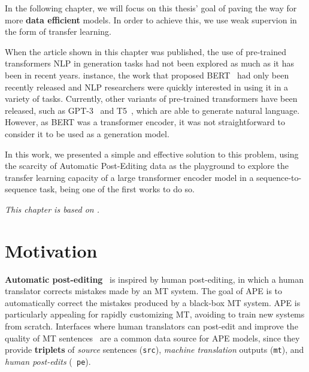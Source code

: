 \label{chap:ape}

\cleardoublepage
{}

In the following chapter, we will focus on this thesis' goal of
paving the way for more \textbf{data efficient} models. In order to
achieve this, we use weak supervion in the form of transfer learning.

When the article shown in this chapter was published, the use of
pre-trained transformers %
NLP in generation tasks had not been explored as much as it has been
in recent years. %
instance, the work that proposed BERT~\citep{devlin2018bert} had only
been recently released and NLP researchers were quickly interested in
using it in a variety of tasks. Currently, other variants of
pre-trained transformers have been released, such as
GPT-3~\citep{brown2020language} and
T5~\citep{raffel2020Exploringlimitstransfer}, which are able to
generate natural language. However, as BERT was a transformer
encoder, it was not straightforward to consider it to be used as a
generation model.

In this work, we presented a simple and effective
solution to this problem, using the scarcity of Automatic Post-Editing
data as the playground to explore the transfer learning capacity of a
large transformer encoder model in a sequence-to-sequence task,
being one of the first works to do so.

\emph{This chapter is based on \citet{Correia2019}.}

\section{Motivation}

 {\bf Automatic post-editing}~\citep[APE;][]{simard2007rule} is
inspired by human post-editing, in which a human translator corrects
mistakes made by an MT system.
The goal of APE is to automatically correct the mistakes produced by
a black-box MT system. APE is particularly
appealing for rapidly customizing MT, avoiding to train new systems
from scratch. Interfaces where human translators can post-edit and
improve the quality of MT
sentences~\citep{Alabau2014,Federico2014,Denkowski2015,Hokamp2018}
are a common data source for APE models, since they provide {\bf
        triplets} of {\it source} sentences ({\tt src}), {\it machine
        translation} outputs ({\tt mt}), and {\it human post-edits} ({\tt
        pe}).

